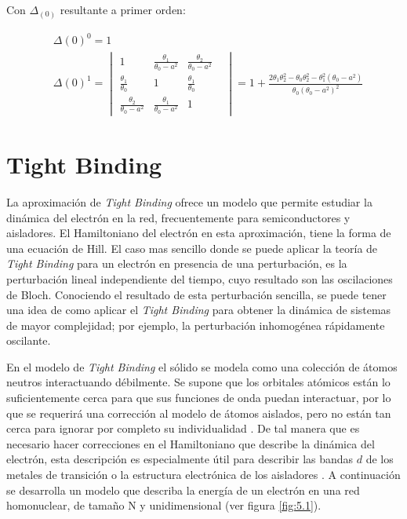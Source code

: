 Con $\Delta_{(0)}$ resultante a primer orden:

\begin{equation}
\begin{aligned}
& \Delta(0)^0=1 \\
& \Delta(0)^1=
\begin{vmatrix}
 1 & \frac{\theta_1}{\theta_0-a^2} & \frac{\theta_2}{\theta_0-a^2} \\ 
 \frac{\theta_1}{\theta_0} & 1 & \frac{\theta_1}{\theta_0}  \\
 \frac{\theta_2}{\theta_0-a^2} & \frac{\theta_1}{\theta_0-a^2} & 1 &  
\end{vmatrix}
= 1+\frac{2\theta_1\theta_2^2-\theta_0\theta_2^2-\theta_1^2(\theta_0-a^2)}{\theta_0(\theta_0-a^2)^2}
\end{aligned}
\end{equation}



\section{Tight Binding}\label{cap:5}
La aproximación de \textit{Tight Binding} ofrece un modelo que permite estudiar la dinámica del electrón en la red, frecuentemente para semiconductores y aisladores. El Hamiltoniano del electrón en esta aproximación, tiene la forma de una ecuación de Hill. El caso mas sencillo donde se puede aplicar la teoría de \textit{Tight Binding} para un electrón en presencia de una perturbación, es la perturbación lineal independiente del tiempo, cuyo resultado son las oscilaciones de Bloch. Conociendo el resultado de esta perturbación sencilla, se puede tener una idea de como aplicar el \textit{Tight Binding} para obtener la dinámica de sistemas de mayor complejidad; por ejemplo, la perturbación inhomogénea rápidamente oscilante. 

En el modelo de \textit{Tight Binding} el sólido se modela como una colección de átomos neutros interactuando débilmente. Se supone que los orbitales atómicos están lo suficientemente cerca para que sus funciones de onda puedan interactuar, por lo que se requerirá una corrección al modelo de átomos aislados, pero no están tan cerca para ignorar por completo su individualidad . De tal manera que es necesario hacer correcciones en el Hamiltoniano que describe la dinámica del electrón, esta descripción es especialmente útil para describir las bandas $d$ de los metales de transición o la estructura electrónica de los aisladores \cite{ashc}. A continuación se desarrolla un modelo que describa la energía de un electrón en una red homonuclear, de tamaño N y  unidimensional (ver figura \ref{fig:5.1}).

